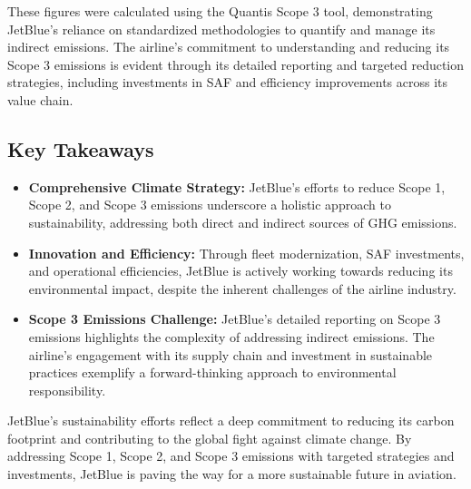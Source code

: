 \noindent These figures were calculated using the Quantis Scope 3 tool, demonstrating JetBlue's reliance on standardized methodologies to quantify and manage its indirect emissions. The airline's commitment to understanding and reducing its Scope 3 emissions is evident through its detailed reporting and targeted reduction strategies, including investments in SAF and efficiency improvements across its value chain.

\subsection*{Key Takeaways}
\begin{itemize}
    \item \textbf{Comprehensive Climate Strategy:} JetBlue's efforts to reduce Scope 1, Scope 2, and Scope 3 emissions underscore a holistic approach to sustainability, addressing both direct and indirect sources of GHG emissions.
    \item \textbf{Innovation and Efficiency:} Through fleet modernization, SAF investments, and operational efficiencies, JetBlue is actively working towards reducing its environmental impact, despite the inherent challenges of the airline industry.
    \item \textbf{Scope 3 Emissions Challenge:} JetBlue's detailed reporting on Scope 3 emissions highlights the complexity of addressing indirect emissions. The airline's engagement with its supply chain and investment in sustainable practices exemplify a forward-thinking approach to environmental responsibility.
\end{itemize}

\noindent JetBlue's sustainability efforts reflect a deep commitment to reducing its carbon footprint and contributing to the global fight against climate change. By addressing Scope 1, Scope 2, and Scope 3 emissions with targeted strategies and investments, JetBlue is paving the way for a more sustainable future in aviation.